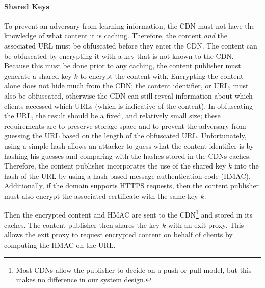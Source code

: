 \paragraph{Shared Keys} 
To prevent an adversary from learning information, the CDN must not have the knowledge of what 
content it is caching.  Therefore, the content {\it and} the associated URL must be obfuscated 
before they enter the CDN.  The content can be obfuscated by encrypting it with a key that is not 
known to the CDN.  Because this must be done prior to any caching, the content publisher must 
generate a shared key $k$ to encrypt the content with. Encrypting the content alone does not 
hide much from the CDN; the content identifier, or URL, must also be obfuscated, otherwise the 
CDN can still reveal information about which clients accessed which URLs (which is indicative 
of the content).  In obfuscating the URL, the result should be a fixed, and relatively small size; 
these requirements are to preserve storage space and to prevent the adversary from guessing the 
URL based on the length of the obfuscated URL.  Unfortunately, using a simple hash allows an 
attacker to guess what the content identifier is by hashing his guesses and comparing with 
the hashes stored in the CDNs caches.  Therefore, the content publisher incorporates the use 
of the shared key $k$ into the hash of the URL by using a hash-based message authentication code 
(HMAC).  Additionally, if the domain supports HTTPS requests, then the content publisher must 
also encrypt the associated certificate with the same key $k$.

Then the encrypted content and HMAC are sent to the CDN\footnote{Most CDNs allow the publisher to 
decide on a push or pull model, but this makes no difference in our system design.} and stored in 
its caches.  The content publisher then shares the key $k$ with an exit proxy.  This allows the 
exit proxy to request encrypted content on behalf of clients by computing the HMAC on the URL.  


